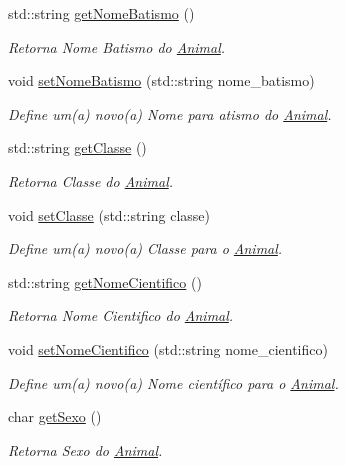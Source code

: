 \begin{DoxyCompactItemize}
std\+::string \hyperlink{classAnimal_aee0219bd596f0af49fa51fcdad29a1a7}{get\+Nome\+Batismo} ()
\begin{DoxyCompactList}\small\item\em Retorna Nome Batismo do \hyperlink{classAnimal}{Animal}. \end{DoxyCompactList}\item 
void \hyperlink{classAnimal_a6f77d89ef0c02d85dfe1dd7508122ce3}{set\+Nome\+Batismo} (std\+::string nome\+\_\+batismo)
\begin{DoxyCompactList}\small\item\em Define um(a) novo(a) Nome para atismo do \hyperlink{classAnimal}{Animal}. \end{DoxyCompactList}\item 
std\+::string \hyperlink{classAnimal_a22e54ff48117237f9a201f5eca0eea81}{get\+Classe} ()
\begin{DoxyCompactList}\small\item\em Retorna Classe do \hyperlink{classAnimal}{Animal}. \end{DoxyCompactList}\item 
void \hyperlink{classAnimal_ae1956de8a017d0b1cd506935cd1a57e0}{set\+Classe} (std\+::string classe)
\begin{DoxyCompactList}\small\item\em Define um(a) novo(a) Classe para o \hyperlink{classAnimal}{Animal}. \end{DoxyCompactList}\item 
std\+::string \hyperlink{classAnimal_a9b316bf80a121cd5dc077158055c162f}{get\+Nome\+Cientifico} ()
\begin{DoxyCompactList}\small\item\em Retorna Nome Cientifico do \hyperlink{classAnimal}{Animal}. \end{DoxyCompactList}\item 
void \hyperlink{classAnimal_ad2e0ffb0dcb6b58467010d9f11488899}{set\+Nome\+Cientifico} (std\+::string nome\+\_\+cientifico)
\begin{DoxyCompactList}\small\item\em Define um(a) novo(a) Nome científico para o \hyperlink{classAnimal}{Animal}. \end{DoxyCompactList}\item 
char \hyperlink{classAnimal_a7349027418d900a9cd7cfc32001b6f7d}{get\+Sexo} ()
\begin{DoxyCompactList}\small\item\em Retorna Sexo do \hyperlink{classAnimal}{Animal}. \end{DoxyCompactList}\item 

\end{DoxyCompactItemize}
